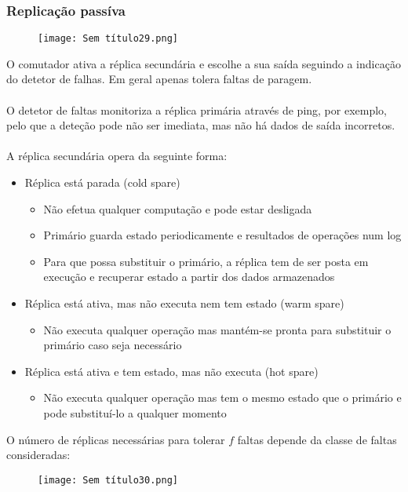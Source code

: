\documentclass[10pt,a4paper]{report}
\begin{document}
\subsubsection{Replicação passíva}
\begin{figure}[H]
\centering
\texttt{[image: Sem título29.png]}
\end{figure}
O comutador ativa a réplica secundária e escolhe a sua saída seguindo a indicação do detetor de falhas. Em geral apenas tolera faltas de paragem.\\
\\
O detetor de faltas monitoriza a réplica primária através de ping, por exemplo, pelo que a deteção pode não ser imediata, mas não há dados de saída incorretos.\\
\\
A réplica secundária opera da seguinte forma:
\begin{itemize}
\item Réplica está parada (cold spare)
\begin{itemize}
\item Não efetua qualquer computação e pode estar desligada
\item Primário guarda estado periodicamente e resultados de operações num log
\item Para que possa substituir o primário, a réplica tem de ser posta em execução e recuperar estado a partir dos dados armazenados
\end{itemize}
\item Réplica está ativa, mas não executa nem tem estado (warm spare)
\begin{itemize}
\item Não executa qualquer operação mas mantém-se pronta para substituir o primário caso seja necessário
\end{itemize}
\item Réplica está ativa e tem estado, mas não executa (hot spare)
\begin{itemize}
\item Não executa qualquer operação mas tem o mesmo estado que o
primário e pode substituí-lo a qualquer momento
\end{itemize}
\end{itemize}
O número de réplicas necessárias para tolerar $f$ faltas depende da classe de faltas consideradas:
\begin{figure}[H]
\centering
\texttt{[image: Sem título30.png]}
\end{figure}
\end{document}
